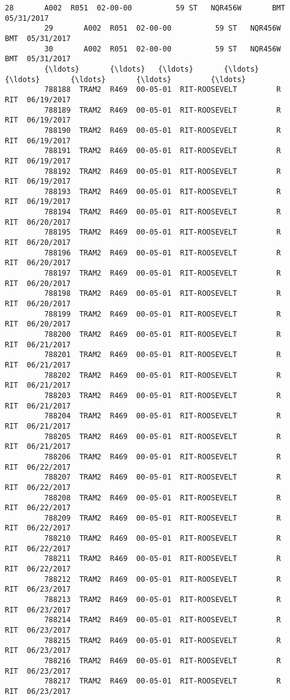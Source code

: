 \documentclass[11pt]{article}
\begin{document}
\begin{Verbatim}[commandchars=\\\{\}]
         28       A002  R051  02-00-00          59 ST   NQR456W       BMT  05/31/2017   
         29       A002  R051  02-00-00          59 ST   NQR456W       BMT  05/31/2017   
         30       A002  R051  02-00-00          59 ST   NQR456W       BMT  05/31/2017   
         {\ldots}       {\ldots}   {\ldots}       {\ldots}            {\ldots}       {\ldots}       {\ldots}         {\ldots}   
         788188  TRAM2  R469  00-05-01  RIT-ROOSEVELT         R       RIT  06/19/2017   
         788189  TRAM2  R469  00-05-01  RIT-ROOSEVELT         R       RIT  06/19/2017   
         788190  TRAM2  R469  00-05-01  RIT-ROOSEVELT         R       RIT  06/19/2017   
         788191  TRAM2  R469  00-05-01  RIT-ROOSEVELT         R       RIT  06/19/2017   
         788192  TRAM2  R469  00-05-01  RIT-ROOSEVELT         R       RIT  06/19/2017   
         788193  TRAM2  R469  00-05-01  RIT-ROOSEVELT         R       RIT  06/19/2017   
         788194  TRAM2  R469  00-05-01  RIT-ROOSEVELT         R       RIT  06/20/2017   
         788195  TRAM2  R469  00-05-01  RIT-ROOSEVELT         R       RIT  06/20/2017   
         788196  TRAM2  R469  00-05-01  RIT-ROOSEVELT         R       RIT  06/20/2017   
         788197  TRAM2  R469  00-05-01  RIT-ROOSEVELT         R       RIT  06/20/2017   
         788198  TRAM2  R469  00-05-01  RIT-ROOSEVELT         R       RIT  06/20/2017   
         788199  TRAM2  R469  00-05-01  RIT-ROOSEVELT         R       RIT  06/20/2017   
         788200  TRAM2  R469  00-05-01  RIT-ROOSEVELT         R       RIT  06/21/2017   
         788201  TRAM2  R469  00-05-01  RIT-ROOSEVELT         R       RIT  06/21/2017   
         788202  TRAM2  R469  00-05-01  RIT-ROOSEVELT         R       RIT  06/21/2017   
         788203  TRAM2  R469  00-05-01  RIT-ROOSEVELT         R       RIT  06/21/2017   
         788204  TRAM2  R469  00-05-01  RIT-ROOSEVELT         R       RIT  06/21/2017   
         788205  TRAM2  R469  00-05-01  RIT-ROOSEVELT         R       RIT  06/21/2017   
         788206  TRAM2  R469  00-05-01  RIT-ROOSEVELT         R       RIT  06/22/2017   
         788207  TRAM2  R469  00-05-01  RIT-ROOSEVELT         R       RIT  06/22/2017   
         788208  TRAM2  R469  00-05-01  RIT-ROOSEVELT         R       RIT  06/22/2017   
         788209  TRAM2  R469  00-05-01  RIT-ROOSEVELT         R       RIT  06/22/2017   
         788210  TRAM2  R469  00-05-01  RIT-ROOSEVELT         R       RIT  06/22/2017   
         788211  TRAM2  R469  00-05-01  RIT-ROOSEVELT         R       RIT  06/22/2017   
         788212  TRAM2  R469  00-05-01  RIT-ROOSEVELT         R       RIT  06/23/2017   
         788213  TRAM2  R469  00-05-01  RIT-ROOSEVELT         R       RIT  06/23/2017   
         788214  TRAM2  R469  00-05-01  RIT-ROOSEVELT         R       RIT  06/23/2017   
         788215  TRAM2  R469  00-05-01  RIT-ROOSEVELT         R       RIT  06/23/2017   
         788216  TRAM2  R469  00-05-01  RIT-ROOSEVELT         R       RIT  06/23/2017   
         788217  TRAM2  R469  00-05-01  RIT-ROOSEVELT         R       RIT  06/23/2017   
         

\end{Verbatim}
\end{document}
